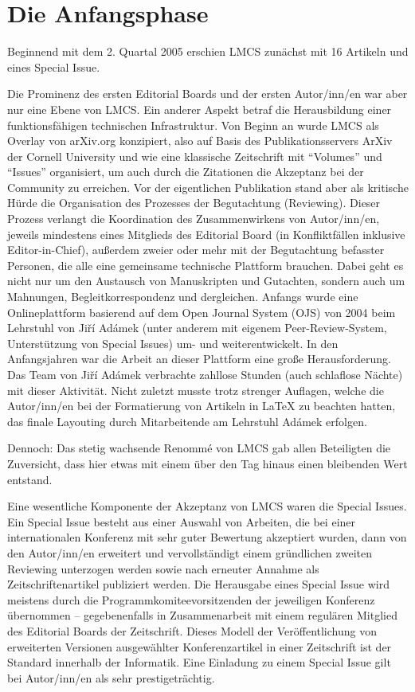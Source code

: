 \documentclass[a4paper,
fontsize=11pt,
oneside,
numbers=noperiodatend,
parskip=half-,
bibliography=totoc,
final
]{scrartcl}
\begin{document}
\hypertarget{die-anfangsphase}{%
\section{Die Anfangsphase}\label{die-anfangsphase}}

Beginnend mit dem 2. Quartal 2005 erschien LMCS zunächst mit 16 Artikeln
und eines Special Issue.

Die Prominenz des ersten Editorial Boards und der ersten Autor/inn/en
war aber nur eine Ebene von LMCS. Ein anderer Aspekt betraf die
Herausbildung einer funktionsfähigen technischen Infrastruktur. Von
Beginn an wurde LMCS als Overlay von arXiv.org konzipiert, also auf
Basis des Publikationsservers ArXiv der Cornell University und wie eine
klassische Zeitschrift mit \enquote{Volumes} und \enquote{Issues}
organisiert, um auch durch die Zitationen die Akzeptanz bei der
Community zu erreichen. Vor der eigentlichen Publikation stand aber als
kritische Hürde die Organisation des Prozesses der Begutachtung
(Reviewing). Dieser Prozess verlangt die Koordination des
Zusammenwirkens von Autor/inn/en, jeweils mindestens eines Mitglieds des
Editorial Board (in Konfliktfällen inklusive Editor-in-Chief), außerdem
zweier oder mehr mit der Begutachtung befasster Personen, die alle eine
gemeinsame technische Plattform brauchen. Dabei geht es nicht nur um den
Austausch von Manuskripten und Gutachten, sondern auch um Mahnungen,
Begleitkorrespondenz und dergleichen. Anfangs wurde eine Onlineplattform
basierend auf dem Open Journal System (OJS) von 2004 beim Lehrstuhl von
Jiří Adámek (unter anderem mit eigenem Peer-Review-System, Unterstützung
von Special Issues) um- und weiterentwickelt. In den Anfangsjahren war
die Arbeit an dieser Plattform eine große Herausforderung. Das Team von
Jiří Adámek verbrachte zahllose Stunden (auch schlaflose Nächte) mit
dieser Aktivität. Nicht zuletzt musste trotz strenger Auflagen, welche
die Autor/inn/en bei der Formatierung von Artikeln in LaTeX zu beachten
hatten, das finale Layouting durch Mitarbeitende am Lehrstuhl Adámek
erfolgen.

Dennoch: Das stetig wachsende Renommé von LMCS gab allen Beteiligten die
Zuversicht, dass hier etwas mit einem über den Tag hinaus einen
bleibenden Wert entstand.

Eine wesentliche Komponente der Akzeptanz von LMCS waren die Special
Issues. Ein Special Issue besteht aus einer Auswahl von Arbeiten, die
bei einer internationalen Konferenz mit sehr guter Bewertung akzeptiert
wurden, dann von den Autor/inn/en erweitert und vervollständigt einem
gründlichen zweiten Reviewing unterzogen werden sowie nach erneuter
Annahme als Zeitschriftenartikel publiziert werden. Die Herausgabe eines
Special Issue wird meistens durch die Programmkomiteevorsitzenden der
jeweiligen Konferenz übernommen -- gegebenenfalls in Zusammenarbeit mit
einem regulären Mitglied des Editorial Boards der Zeitschrift. Dieses
Modell der Veröffentlichung von erweiterten Versionen ausgewählter
Konferenzartikel in einer Zeitschrift ist der Standard innerhalb der
Informatik. Eine Einladung zu einem Special Issue gilt bei Autor/inn/en
als sehr prestigeträchtig.
\end{document}
